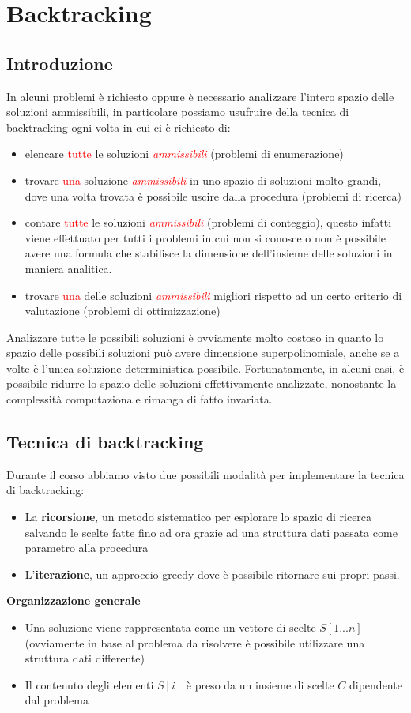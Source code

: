 \documentclass[../cheatSheetAlgoritmi.tex]{subfiles}
\begin{document}
\section{Backtracking}
\subsection{Introduzione}
In alcuni problemi è richiesto oppure è necessario analizzare l'intero spazio delle soluzioni ammissibili, in particolare possiamo usufruire della tecnica di backtracking ogni volta in cui ci è richiesto di:
\begin{itemize}
	\item elencare \textcolor{red}{tutte} le soluzioni \textcolor{red}{\emph{ammissibili}} (problemi di enumerazione)
	\item trovare  \textcolor{red}{una} soluzione \textcolor{red}{\emph{ammissibili}} in uno spazio di soluzioni molto grandi, dove una volta trovata è possibile uscire dalla procedura (problemi di ricerca)
	\item contare  \textcolor{red}{tutte} le soluzioni \textcolor{red}{\emph{ammissibili}} (problemi di conteggio), questo infatti viene effettuato per tutti i problemi in cui non si conosce o non è possibile avere una formula che stabilisce la dimensione dell'insieme delle soluzioni in maniera analitica.
	\item trovare \textcolor{red}{una} delle soluzioni \textcolor{red}{\emph{ammissibili}} migliori rispetto ad un certo criterio di valutazione (problemi di ottimizzazione)
\end{itemize}
Analizzare tutte le possibili soluzioni è ovviamente molto costoso in quanto lo spazio delle possibili soluzioni può avere dimensione superpolinomiale, anche se a volte è l'unica soluzione deterministica possibile. Fortunatamente, in alcuni casi, è possibile ridurre lo spazio delle soluzioni effettivamente analizzate, nonostante la complessità computazionale rimanga di fatto invariata. 
\subsection{Tecnica di backtracking}
Durante il corso abbiamo visto due possibili modalità per implementare la tecnica di backtracking: 
\begin{itemize}
	\item La \textbf{ricorsione}, un metodo sistematico per esplorare lo spazio di ricerca salvando le scelte fatte fino ad ora grazie ad una struttura dati passata come parametro alla procedura
	\item L'\textbf{iterazione}, un approccio greedy dove è possibile ritornare sui propri passi.
\end{itemize}
\textbf{Organizzazione generale} 
\begin{itemize}
	\item Una soluzione viene rappresentata come un vettore di scelte $S[1...n]$ (ovviamente in base al problema da risolvere è possibile utilizzare una struttura dati differente)
	\item Il contenuto degli elementi $S[i]$ è preso da un insieme di scelte $C$ dipendente dal problema
\end{itemize}
\newpage
\end{document}

